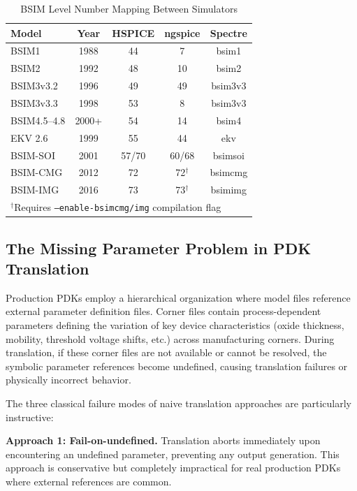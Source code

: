 \documentclass[10pt,twocolumn]{article}
\begin{document}
\begin{table}[!t]
\caption{BSIM Level Number Mapping Between Simulators}
\label{tab:bsim_levels}
\centering
\renewcommand{\arraystretch}{1.15}
\begin{tabular}{@{}lcccc@{}}
\toprule
\textbf{Model} & \textbf{Year} & \textbf{HSPICE} & \textbf{ngspice} & \textbf{Spectre} \\
\midrule
BSIM1 & 1988 & 44 & 7 & bsim1 \\
BSIM2 & 1992 & 48 & 10 & bsim2 \\
BSIM3v3.2 & 1996 & 49 & 49 & bsim3v3 \\
BSIM3v3.3 & 1998 & 53 & 8 & bsim3v3 \\
BSIM4.5--4.8 & 2000+ & 54 & 14 & bsim4 \\
EKV 2.6 & 1999 & 55 & 44 & ekv \\
BSIM-SOI & 2001 & 57/70 & 60/68 & bsimsoi \\
BSIM-CMG & 2012 & 72 & 72$^\dagger$ & bsimcmg \\
BSIM-IMG & 2016 & 73 & 73$^\dagger$ & bsimimg \\
\bottomrule
\multicolumn{5}{l}{\footnotesize $^\dagger$Requires \texttt{--enable-bsimcmg/img} compilation flag}
\end{tabular}
\end{table}

\subsection{The Missing Parameter Problem in PDK Translation}

Production PDKs employ a hierarchical organization where model files reference external parameter definition files. Corner files contain process-dependent parameters defining the variation of key device characteristics (oxide thickness, mobility, threshold voltage shifts, etc.) across manufacturing corners. During translation, if these corner files are not available or cannot be resolved, the symbolic parameter references become undefined, causing translation failures or physically incorrect behavior.

The three classical failure modes of naive translation approaches are particularly instructive:

\textbf{Approach 1: Fail-on-undefined.} Translation aborts immediately upon encountering an undefined parameter, preventing any output generation. This approach is conservative but completely impractical for real production PDKs where external references are common.
\end{document}
